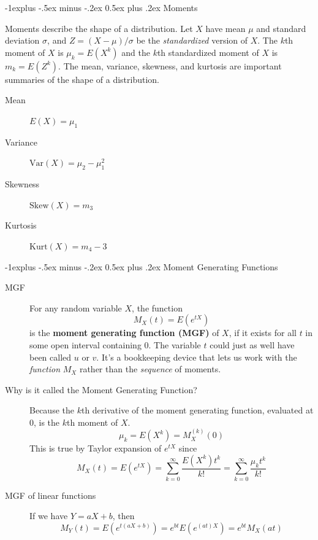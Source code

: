 \documentclass[10pt,landscape]{article}
\makeatletter
\newcommand{\var}{\textrm{Var}}
\renewcommand{\subsection}{\@startsection{subsection}{2}{0mm}%
                                {-1explus -.5ex minus -.2ex}%
                                {0.5ex plus .2ex}%
                                {\normalfont\normalsize\bfseries}}
\makeatother
\begin{document}
\begin{multicols*}{3}
\subsection{Moments}

Moments describe the shape of a distribution. Let $X$ have mean $\mu$ and standard deviation $\sigma$, and $Z=(X-\mu)/\sigma$ be the \emph{standardized} version of $X$. The $k$th moment of $X$ is $\mu_k = E(X^k)$ and the $k$th standardized moment of $X$ is $ m_k = E (Z^k)$.
The mean, variance,  skewness, and kurtosis are important summaries of the shape of a distribution.
    \begin{description}
        \item[Mean] $E(X) = \mu_1 $
        \item[Variance] $\var(X) = \mu_2 - \mu_1^2$
        \item[Skewness] $\textrm{Skew}(X) = m_3$
      \item[Kurtosis] $\textrm{Kurt}(X) = m_4 - 3$
    \end{description}

\subsection{Moment Generating Functions}

\begin{description}
    \item[MGF] For any random variable $X$, the function
        \[ M_X(t) = E(e^{tX}) \]
        is the \textbf{moment generating function (MGF)} of $X$, if it exists for all $t$ in some open interval containing $0$. The variable $t$ could just as well have been called $u$ or $v$. It's a bookkeeping device that lets us work with the \emph{function} $M_X$ rather than the \emph{sequence} of moments. 
                
            \item[Why is it called the Moment Generating Function?] Because the $k$th derivative of the moment generating function, evaluated at $0$, is the $k$th moment of $X$.
    \[\mu_k = E(X^k) = M_X^{(k)}(0)\]
    This is true by Taylor expansion of $e^{tX}$ since
    \[M_X(t) = E(e^{tX}) = \sum_{k=0}^\infty \frac{E(X^k)t^k}{k!} = \sum_{k=0}^\infty \frac{\mu_k t^k}{k!} \]

    \item[MGF of linear functions] If we have $Y = aX + b$, then
        \[M_Y(t) = E(e^{t(aX + b)}) =  e^{bt}E(e^{(at)X}) = e^{bt}M_X(at)\]
       

\end{description}
\end{multicols*}
\end{document}
